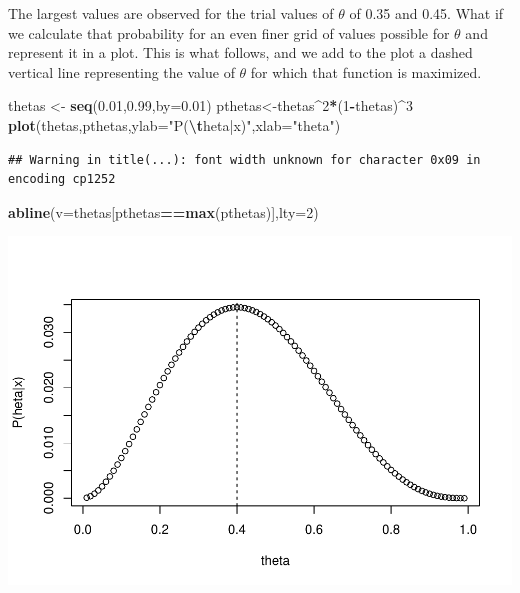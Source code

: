 \documentclass[
]{book}
\newenvironment{Shaded}{\begin{snugshade}}{\end{snugshade}}
\newcommand{\AttributeTok}[1]{\textcolor[rgb]{0.13,0.29,0.53}{#1}}
\newcommand{\DecValTok}[1]{\textcolor[rgb]{0.00,0.00,0.81}{#1}}
\newcommand{\FloatTok}[1]{\textcolor[rgb]{0.00,0.00,0.81}{#1}}
\newcommand{\FunctionTok}[1]{\textcolor[rgb]{0.13,0.29,0.53}{\textbf{#1}}}
\newcommand{\NormalTok}[1]{#1}
\newcommand{\OtherTok}[1]{\textcolor[rgb]{0.56,0.35,0.01}{#1}}
\newcommand{\SpecialCharTok}[1]{\textcolor[rgb]{0.81,0.36,0.00}{\textbf{#1}}}
\newcommand{\StringTok}[1]{\textcolor[rgb]{0.31,0.60,0.02}{#1}}
\begin{document}
The largest values are observed for the trial values of \(\theta\) of 0.35 and 0.45. What if we calculate that probability for an even finer grid of values possible for \(\theta\) and represent it in a plot. This is what follows, and we add to the plot a dashed vertical line representing the value of \(\theta\) for which that function is maximized.

\begin{Shaded}
\begin{Highlighting}[]
\NormalTok{thetas }\OtherTok{\textless{}{-}} \FunctionTok{seq}\NormalTok{(}\FloatTok{0.01}\NormalTok{,}\FloatTok{0.99}\NormalTok{,}\AttributeTok{by=}\FloatTok{0.01}\NormalTok{)}
\NormalTok{pthetas}\OtherTok{\textless{}{-}}\NormalTok{thetas}\SpecialCharTok{\^{}}\DecValTok{2}\SpecialCharTok{*}\NormalTok{(}\DecValTok{1}\SpecialCharTok{{-}}\NormalTok{thetas)}\SpecialCharTok{\^{}}\DecValTok{3}
\FunctionTok{plot}\NormalTok{(thetas,pthetas,}\AttributeTok{ylab=}\StringTok{"P(}\SpecialCharTok{\textbackslash{}t}\StringTok{heta|x)"}\NormalTok{,}\AttributeTok{xlab=}\StringTok{"theta"}\NormalTok{)}
\end{Highlighting}
\end{Shaded}

\begin{verbatim}
## Warning in title(...): font width unknown for character 0x09 in encoding cp1252
\end{verbatim}

\begin{Shaded}
\begin{Highlighting}[]
\FunctionTok{abline}\NormalTok{(}\AttributeTok{v=}\NormalTok{thetas[pthetas}\SpecialCharTok{==}\FunctionTok{max}\NormalTok{(pthetas)],}\AttributeTok{lty=}\DecValTok{2}\NormalTok{)}
\end{Highlighting}
\end{Shaded}

\includegraphics{ECOMODbook_files/figure-latex/ch13.3-1.pdf}
\end{document}
